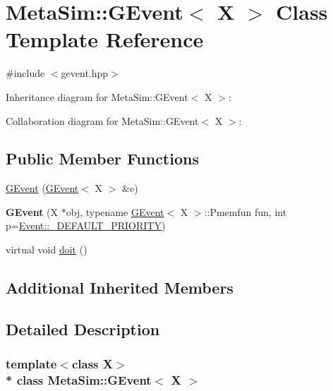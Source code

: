 \hypertarget{classMetaSim_1_1GEvent}{}\section{Meta\+Sim\+:\+:G\+Event$<$ X $>$ Class Template Reference}
\label{classMetaSim_1_1GEvent}


{\ttfamily \#include $<$gevent.\+hpp$>$}



Inheritance diagram for Meta\+Sim\+:\+:G\+Event$<$ X $>$\+:


Collaboration diagram for Meta\+Sim\+:\+:G\+Event$<$ X $>$\+:
\subsection*{Public Member Functions}
\begin{DoxyCompactItemize}
\item 
\hyperlink{classMetaSim_1_1GEvent_a1207c10d8f19e77fcfc10fea1e07a179}{G\+Event} (\hyperlink{classMetaSim_1_1GEvent}{G\+Event}$<$ X $>$ \&e)
\item 
{\bfseries G\+Event} (X $\ast$obj, typename \hyperlink{classMetaSim_1_1GEvent}{G\+Event}$<$ X $>$\+::Pmemfun fun, int p=\hyperlink{classMetaSim_1_1Event_a93a8a4b3c1db0fdd2fadd7345f0b8c42}{Event\+::\+\_\+\+D\+E\+F\+A\+U\+L\+T\+\_\+\+P\+R\+I\+O\+R\+I\+TY})\hypertarget{classMetaSim_1_1GEvent_af2f285996e2fffa52dd1e942fa16d013}{}\label{classMetaSim_1_1GEvent_af2f285996e2fffa52dd1e942fa16d013}

\item 
virtual void \hyperlink{classMetaSim_1_1GEvent_a50bac7d037bcce48edb2cf2a866ef021}{doit} ()
\end{DoxyCompactItemize}
\subsection*{Additional Inherited Members}


\subsection{Detailed Description}
\subsubsection*{template$<$class X$>$\\*
class Meta\+Sim\+::\+G\+Event$<$ X $>$}

